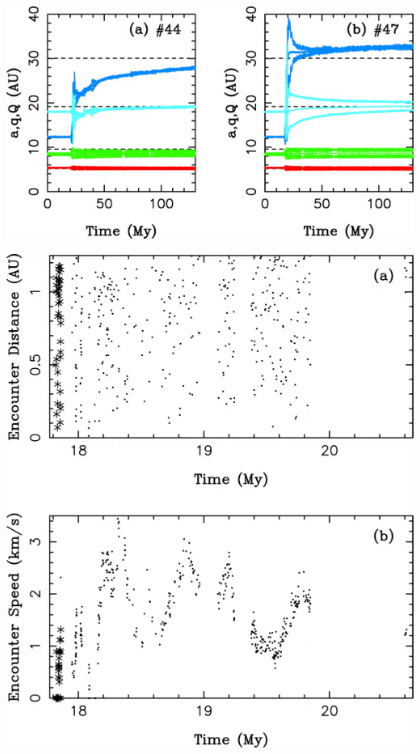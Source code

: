 \documentclass[10pt,a4paper,twoside]{article}
\renewenvironment{figure}{}{}
\begin{document}
\begin{figure}[tbn]
\includegraphics[scale=1]{img/Nesvorny2007-1.jpg}
\caption{ }
\end{figure}
\begin{figure}[tbn]
\includegraphics[scale=0.2]{img/Nesvorny2007-2.png}
\caption{•}
\end{figure}
\end{document}

